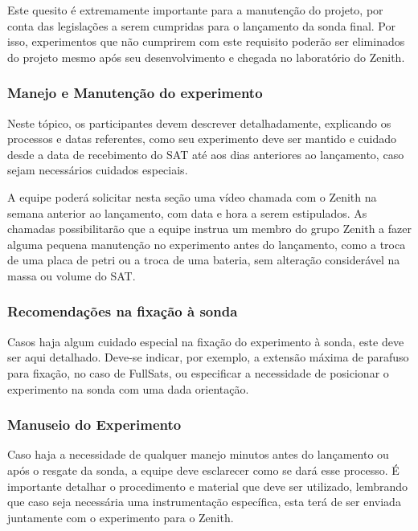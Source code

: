             Este quesito é extremamente importante para a manutenção do projeto, por conta das legislações a serem cumpridas para o lançamento da sonda final. Por isso, experimentos que não cumprirem com este requisito poderão ser eliminados do projeto mesmo após seu desenvolvimento e chegada no laboratório do Zenith.

        \subsubsection{Manejo e Manutenção do experimento}
            
            Neste tópico, os participantes devem descrever detalhadamente, explicando os processos e datas referentes, como seu experimento deve ser mantido e cuidado desde a data de recebimento do SAT até aos dias anteriores ao lançamento, caso sejam necessários cuidados especiais.
            
            A equipe poderá solicitar nesta seção uma vídeo chamada com o Zenith na semana anterior ao lançamento, com data e hora a serem estipulados. As chamadas possibilitarão que a equipe instrua um membro do grupo Zenith a fazer alguma pequena manutenção no experimento antes do lançamento, como a troca de uma placa de petri ou a troca de uma bateria, sem alteração considerável na massa ou volume do SAT.

        \subsubsection{Recomendações na fixação à sonda}
            
            Casos haja algum cuidado especial na fixação do experimento à sonda, este deve ser aqui detalhado. Deve-se indicar, por exemplo, a extensão máxima de parafuso para fixação, no caso de FullSats, ou especificar a necessidade de posicionar o experimento na sonda com uma dada orientação.

        \subsubsection{Manuseio do Experimento}
            
            Caso haja a necessidade de qualquer manejo minutos antes do lançamento ou após o resgate da sonda, a equipe deve esclarecer como se dará esse processo. É importante detalhar o procedimento e material que deve ser utilizado, lembrando que caso seja necessária uma instrumentação específica, esta terá de ser enviada juntamente com o experimento para o Zenith.
        
